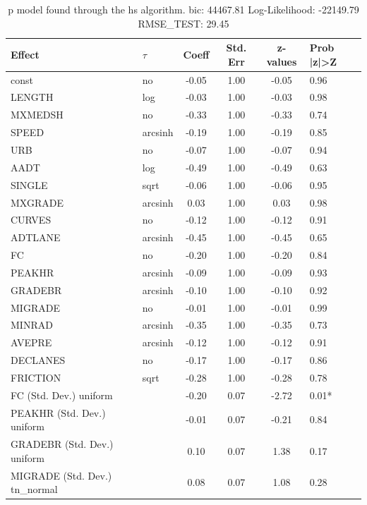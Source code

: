 \begin{table}
	\caption{p model found through the hs algorithm. bic: 44467.81 Log-Likelihood: -22149.79 RMSE_TEST: 29.45}
	\begin{center}
		\begin{tabular}{|l|l|c|c|c|l|}
			\hline
			Effect & $\tau$ & Coeff & Std. Err & z-values & Prob |z|>Z \\
			\hline
			const & no & -0.05 & 1.00 & -0.05 & 0.96 \\
			\hline
			LENGTH & log & -0.03 & 1.00 & -0.03 & 0.98 \\
			\hline
			MXMEDSH & no & -0.33 & 1.00 & -0.33 & 0.74 \\
			\hline
			SPEED & arcsinh & -0.19 & 1.00 & -0.19 & 0.85 \\
			\hline
			URB & no & -0.07 & 1.00 & -0.07 & 0.94 \\
			\hline
			AADT & log & -0.49 & 1.00 & -0.49 & 0.63 \\
			\hline
			SINGLE & sqrt & -0.06 & 1.00 & -0.06 & 0.95 \\
			\hline
			MXGRADE & arcsinh & 0.03 & 1.00 & 0.03 & 0.98 \\
			\hline
			CURVES & no & -0.12 & 1.00 & -0.12 & 0.91 \\
			\hline
			ADTLANE & arcsinh & -0.45 & 1.00 & -0.45 & 0.65 \\
			\hline
			FC & no & -0.20 & 1.00 & -0.20 & 0.84 \\
			\hline
			PEAKHR & arcsinh & -0.09 & 1.00 & -0.09 & 0.93 \\
			\hline
			GRADEBR & arcsinh & -0.10 & 1.00 & -0.10 & 0.92 \\
			\hline
			MIGRADE & no & -0.01 & 1.00 & -0.01 & 0.99 \\
			\hline
			MINRAD & arcsinh & -0.35 & 1.00 & -0.35 & 0.73 \\
			\hline
			AVEPRE & arcsinh & -0.12 & 1.00 & -0.12 & 0.91 \\
			\hline
			DECLANES & no & -0.17 & 1.00 & -0.17 & 0.86 \\
			\hline
			FRICTION & sqrt & -0.28 & 1.00 & -0.28 & 0.78 \\
			\hline
			FC (Std. Dev.) uniform &  & -0.20 & 0.07 & -2.72 & 0.01* \\
			\hline
			PEAKHR (Std. Dev.) uniform &  & -0.01 & 0.07 & -0.21 & 0.84 \\
			\hline
			GRADEBR (Std. Dev.) uniform &  & 0.10 & 0.07 & 1.38 & 0.17 \\
			\hline
			MIGRADE (Std. Dev.) tn_normal &  & 0.08 & 0.07 & 1.08 & 0.28 \\

\end{tabular}
\end{center}
\end{table}
